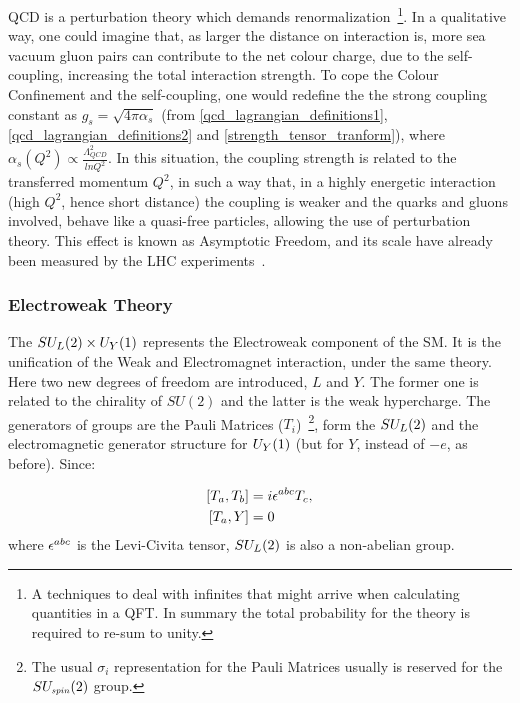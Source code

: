 QCD is a perturbation theory which demands renormalization~\footnote{A techniques to deal with infinites that might arrive when calculating quantities in a QFT. In summary the total probability for the theory is required to re-sum to unity.}. In a qualitative way, one could imagine that, as larger the distance on interaction is, more sea vacuum gluon pairs can contribute to the net colour charge, due to the self-coupling, increasing the total interaction strength. To cope the Colour Confinement and the self-coupling, one would redefine the the strong coupling constant as $g_s = \sqrt{4 \pi \alpha_s}$ (from \ref{qcd_lagrangian_definitions1}, \ref{qcd_lagrangian_definitions2} and \ref{strength_tensor_tranform}), where $\alpha_s(Q^2) \propto \frac{\Lambda^2_{QCD}}{ln Q^2}$. In this situation, the coupling strength is related to the transferred momentum $Q^2$, in such a way that, in a highly energetic interaction (high $Q^2$, hence short distance) the coupling is weaker and the quarks and gluons involved, behave like a quasi-free particles, allowing the use of perturbation theory. This effect is known as Asymptotic Freedom, and its scale have already been measured by the LHC experiments~\cite{pdg_2020}.

\subsubsection{Electroweak Theory}

The $SU_{\scaleto{L}{5pt}}(2) \times U_{\scaleto{Y}{5pt}}(1)$ represents the Electroweak component of the SM. It is the unification of the Weak and Electromagnet interaction, under the same theory. Here two new degrees of freedom are introduced, $L$ and $Y$. The former one is related to the chirality of $SU(2)$ and the latter is the weak hypercharge. The generators of groups are the Pauli Matrices ($T_i$)~\footnote{The usual $\sigma_i$ representation for the Pauli Matrices usually is reserved for the $SU_{\scaleto{spin}{5pt}}(2)$ group.}, form the $SU_{\scaleto{L}{5pt}}(2)$ and the electromagnetic generator structure for $U_{\scaleto{Y}{5pt}}(1)$ (but for $Y$, instead of $-e$, as before). Since:

\begin{equation}
    \begin{split}
        \left[ T_a, T_b \right] &=  i \levicivita{^{abc}}T_c,  \\
        \left[ T_a, Y \right] &=  0
    \end{split}
\label{pauli_commutator}
\end{equation}
where $\levicivita{^{abc}}$ is the Levi-Civita tensor, $SU_{\scaleto{L}{5pt}}(2)$ is also a non-abelian group.

